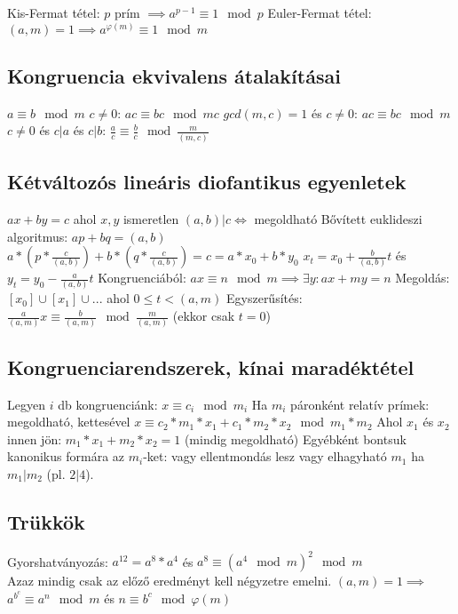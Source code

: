 \documentclass[12pt,a4paper]{article}
\begin{document}
\begin{outline}
	\1 Kis-Fermat tétel: $p$ prím $\implies a^{p-1} \equiv 1 \mod p$
	\1 Euler-Fermat tétel: $(a,m)=1 \implies a^{\varphi(m)} \equiv 1 \mod m$
\end{outline}

\pagebreak

\subsection{Kongruencia ekvivalens átalakításai}

\begin{outline}
	\1 $a \equiv b \mod m$
	\1 $c \ne 0$: $ac \equiv bc \mod mc$
	\1 $gcd(m,c)=1$ és $c \ne 0$: $ac \equiv bc \mod m$
	\1 $c \ne 0$ és $c|a$ és $c|b$: $\frac{a}{c} \equiv \frac{b}{c} \mod \frac{m}{(m,c)}$
\end{outline}

\subsection{Kétváltozós lineáris diofantikus egyenletek}

\begin{outline}
	\1 $ax+by=c$ ahol $x,y$ ismeretlen
	\1 $(a,b)|c \Leftrightarrow$ megoldható
		\2 Bővített euklideszi algoritmus: $ap+bq=(a,b)$
		\2 $a*(p*\frac{c}{(a,b)}) + b*(q*\frac{c}{(a,b)}) = c = a*x_0 + b*y_0$
		\2 $x_t = x_0 + \frac{b}{(a,b)}t$ \;\; és \;\; $y_t = y_0 - \frac{a}{(a,b)}t$
	\1 Kongruenciából: $ax \equiv n \mod m \implies \exists y: ax + my = n$
		\2 Megoldás: $[x_0] \cup [x_1] \cup ...$ ahol $0 \le t < (a,m)$
		\2 Egyszerűsítés: $\frac{a}{(a,m)}x \equiv \frac{b}{(a,m)} \mod \frac{m}{(a,m)}$
		\;\; (ekkor csak $t=0$)
\end{outline}

\subsection{Kongruenciarendszerek, kínai maradéktétel}

\begin{outline}
	\1 Legyen $i$ db kongruenciánk: $x \equiv c_i \mod m_i$
	\1 Ha $m_i$ páronként relatív prímek: megoldható, kettesével
		\2 $x \equiv c_2*m_1*x_1 + c_1*m_2*x_2 \mod m_1*m_2$
		\2 Ahol $x_1$ és $x_2$ innen jön: $m_1*x_1+m_2*x_2=1$ (mindig megoldható)
	\1 Egyébként bontsuk kanonikus formára az $m_i$-ket:
	vagy ellentmondás lesz vagy elhagyható $m_1$ ha $m_1|m_2$ (pl. $2|4$).
\end{outline}

\subsection{Trükkök}

\begin{outline}
	\1 Gyorshatványozás: $a^{12}=a^8*a^4$ és $a^8 \equiv (a^4 \mod m)^2 \mod m$\\
	Azaz mindig csak az előző eredményt kell négyzetre emelni.
	\1 $(a,m)=1 \implies$ $a^{b^c} \equiv a^n \mod m$ és $n \equiv b^c \mod \varphi(m)$
\end{outline}
\end{document}

